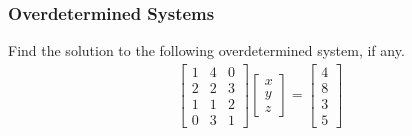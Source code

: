 \subsubsection{Overdetermined Systems}
\begin{exmp}
Find the solution to the following overdetermined system, if any.
\begin{align*}
\begin{bmatrix}
1 & 4 & 0 \\
2 & 2 & 3 \\
1 & 1 & 2 \\
0 & 3 & 1 
\end{bmatrix}
\begin{bmatrix}
x \\
y \\
z 
\end{bmatrix}
=
\begin{bmatrix}
4 \\
8 \\
3 \\
5
\end{bmatrix}   
\end{align*}
\end{exmp}
